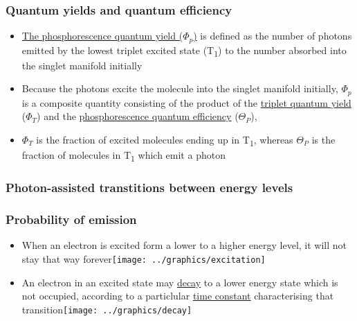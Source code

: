 \documentclass[ignorenonframetext]{beamer}
\begin{document}
\begin{frame}
\frametitle{Quantum yields and quantum efficiency}
\begin{itemize}
\item \underline{The phosphorescence quantum yield (\(\Phi_p\))} is defined as the number of photons emitted by the lowest triplet excited state (T\textsubscript{1}) to the number absorbed into the singlet manifold initially\\
{\centering {}}
\item Because the photons excite the molecule into the singlet manifold initially, \(\Phi_p\) is a composite quantity consisting of the product of the \underline{triplet quantum yield} (\(\Phi_T\)) and the \underline{phosphorescence quantum efficiency} (\(\Theta_P\)), 
\item \(\Phi_T\) is the fraction of excited molecules ending up in T\textsubscript{1}, whereas \(\Theta_P\) is the fraction of molecules in T\textsubscript{1} which emit a photon
\end{itemize}
\end{frame}

\begin{frame}
\frametitle{Photon-assisted transtitions between energy levels}

\end{frame}

\begin{frame}
\frametitle{Probability of emission}
\begin{itemize}[<+->]
\item When an electron is excited form a lower to a higher energy level, it will not stay that way forever\newline \texttt{[image: ../graphics/excitation]} \medskip
\item An electron in an excited state may \underline{decay} to a lower energy state which is not occupied, according to a particlular \underline{time constant} characterising that transition\newline \texttt{[image: ../graphics/decay]}
\end{itemize}
\end{frame}
\end{document}

